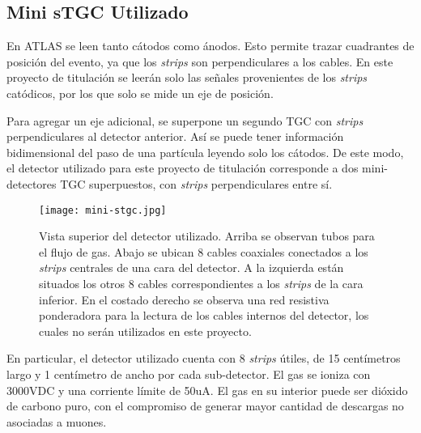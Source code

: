 \subsection*{Mini sTGC Utilizado}
	En ATLAS se leen tanto cátodos como ánodos. Esto permite trazar cuadrantes de posición del evento, ya que los \textit{strips} son perpendiculares a los cables. En este proyecto de titulación se leerán solo las señales provenientes de los \textit{strips} catódicos, por los que solo se mide un eje de posición. 
	
	Para agregar un eje adicional, se superpone un segundo TGC con \textit{strips} perpendiculares al detector anterior. Así se puede tener información bidimensional del paso de una partícula leyendo solo los cátodos. De este modo, el detector utilizado para este proyecto de titulación corresponde a dos mini-detectores TGC superpuestos, con \textit{strips} perpendiculares entre sí.
	
	\begin{figure}
		\centering
		\texttt{[image: mini-stgc.jpg]}
		\caption{Vista superior del detector utilizado. Arriba se observan tubos para el flujo de gas. Abajo se ubican 8 cables coaxiales conectados a los \textit{strips} centrales de una cara del detector. A la izquierda están situados los otros 8 cables correspondientes a los \textit{strips} de la cara inferior. En el costado derecho se observa una red resistiva ponderadora para la lectura de los cables internos del detector, los cuales no serán utilizados en este proyecto.}
		\label{img:foto-mini-stgc}
	\end{figure}
	
	En particular, el detector utilizado cuenta con 8 \textit{strips} útiles, de 15 centímetros largo y 1 centímetro de ancho por cada sub-detector. El gas se ioniza con 3000VDC y una corriente límite de 50uA. El gas en su interior puede ser dióxido de carbono puro, con el compromiso de generar mayor cantidad de descargas no asociadas a muones.


